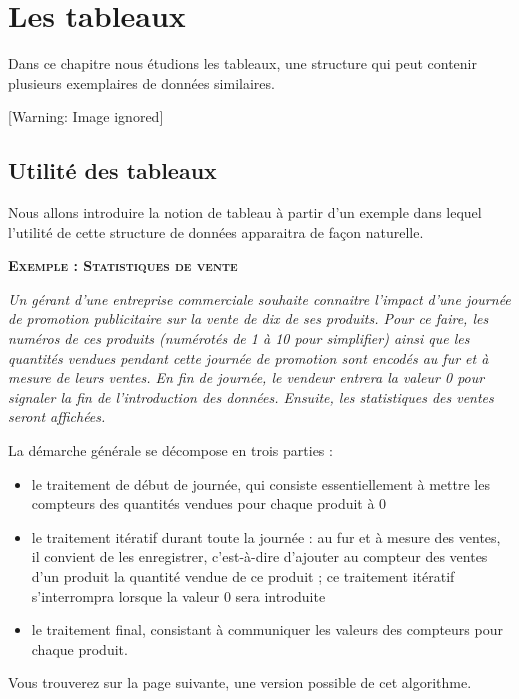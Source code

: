 \chapter[Les tableaux]{
Les tableaux}
{
Dans ce chapitre nous étudions les tableaux, une structure qui peut
contenir plusieurs exemplaires de données similaires.}

\begin{center}
 [Warning: Image ignored] %

\end{center}
\section{Utilité des tableaux}
{
Nous allons introduire la notion de tableau à partir d’un exemple dans
lequel l’utilité de cette structure de données apparaitra de façon
naturelle. }

{\sffamily\bfseries\scshape
Exemple : Statistiques de vente}

{\itshape
Un gérant d’une entreprise commerciale souhaite connaitre l’impact d’une
journée de promotion publicitaire sur la vente de dix de ses produits.
Pour ce faire, les numéros de ces produits (numérotés de 1 à 10 pour
simplifier) ainsi que les quantités vendues pendant cette journée de
promotion sont encodés au fur et à mesure de leurs ventes. En fin de
journée, le vendeur entrera la valeur 0 pour signaler la fin de
l’introduction des données. Ensuite, les statistiques des ventes seront
affichées.}

{
La démarche générale se décompose en trois parties :}

\liststyleListv
\begin{itemize}
\item {
le traitement de début de journée, qui consiste essentiellement à mettre
les compteurs des quantités vendues pour chaque produit à 0}
\item {
le traitement itératif durant toute la journée : au fur et à mesure des
ventes, il convient de les enregistrer, c’est-à-dire d’ajouter au
compteur des ventes d’un produit la quantité vendue de ce produit ; ce
traitement itératif s’interrompra lorsque la valeur 0 sera introduite}
\item {
le traitement final, consistant à communiquer les valeurs des compteurs
pour chaque produit.}
\end{itemize}
{
Vous trouverez sur la page suivante, une version possible de cet
algorithme.}

